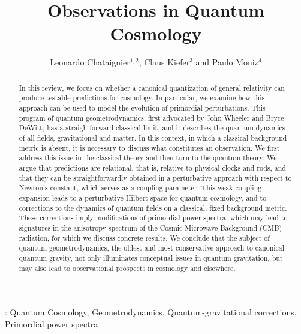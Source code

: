 \documentclass[12pt]{iopart}
\begin{document}
\title[Observations in Quantum Cosmology]{Observations in Quantum Cosmology}
\author{Leonardo Chataignier$^{1,2}$, Claus Kiefer$^3$ and 
Paulo Moniz$^4$}
\address{$^1$ Dipartimento di Fisica e Astronomia, Universit\`{a} di Bologna,
via Irnerio 46, 40126 Bologna, Italy\\$^2$ I.N.F.N., Sezione di Bologna, I.S. FLAG, viale B. Pichat 6/2, 40127 Bologna, Italy\\$^3$ Faculty of Mathematics and Natural Sciences, Institute for Theoretical Physics, University of Cologne, Cologne, Germany\\$^4$ Departamento de F\'{i}sica,
Centro de Matem\'{a}tica e Aplica\c{c}\~{o}es (CMA-UBI),
Universidade da Beira Interior,
6200-001 Covilh\~{a}, Portugal}
\vspace{10pt}

\begin{abstract}
In this review, we focus on whether a canonical quantization of general relativity can produce testable predictions for cosmology. In particular, we examine how this approach can be used to model the evolution of primordial perturbations. This program of quantum geometrodynamics, first advocated by John Wheeler and Bryce DeWitt, has a straightforward classical limit, and it describes the quantum dynamics of all fields, gravitational and matter. In this context, in which a classical background metric is absent, it is necessary to discuss what constitutes an observation. We first address this issue in the classical theory and then turn to the quantum theory. We argue that predictions are relational, that is, relative to physical clocks and rods, and that they can be straightforwardly obtained in a perturbative approach with respect to Newton's constant, which serves as a coupling parameter. This weak-coupling expansion leads to a perturbative Hilbert space for quantum cosmology, and to corrections to the dynamics of quantum fields on a classical, fixed background metric. These corrections imply modifications of primordial power spectra, which may lead to signatures in the anisotropy spectrum of the Cosmic Microwave Background (CMB) radiation, for which we discuss concrete results. We conclude that the subject of quantum geometrodynamics, the oldest and most conservative approach to canonical quantum gravity, not only illuminates conceptual issues in quantum gravitation, but may also lead to observational prospects in cosmology and elsewhere.
\end{abstract}
\submitto{\CQG}
%
\vspace{2pc}
: Quantum Cosmology, Geometrodynamics, Quantum-gravitational corrections, Primordial power spectra
%
%
% 
%
\end{document}
